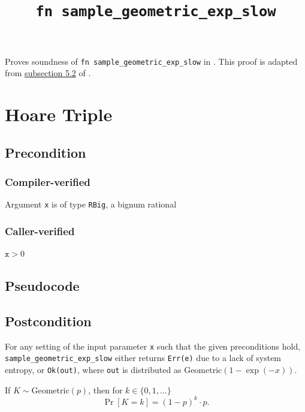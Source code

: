 \documentclass{article}
\title{\texttt{fn sample\_geometric\_exp\_slow}}
\author{\MichaelShoemateAuthor}
\begin{document}
\maketitle

Proves soundness of \texttt{fn sample\_geometric\_exp\_slow} in .
This proof is adapted from \href{https://arxiv.org/pdf/2004.00010.pdf#subsection.5.2}{subsection 5.2} of \cite{CKS20}.

\section{Hoare Triple}
\subsection*{Precondition}
\subsubsection*{Compiler-verified}
Argument \texttt{x} is of type \texttt{RBig}, a bignum rational

\subsubsection*{Caller-verified}
$\texttt{x} > 0$

\subsection*{Pseudocode}


\subsection*{Postcondition}

\begin{theorem}
    \label{postcondition}
    For any setting of the input parameter \texttt{x} such that the given preconditions hold, \\
    \texttt{sample\_geometric\_exp\_slow} either returns \texttt{Err(e)} due to a lack of system entropy,
    or \texttt{Ok(out)}, where \texttt{out} is distributed as $\mathrm{Geometric}(1 - \exp(-x))$.
\end{theorem}

\begin{definition}
    \label{geometric-def}
    If $K \sim \mathrm{Geometric}(p)$, then for $k \in \{0, 1, \ldots\}$
    \begin{equation}
        \Pr[K = k] = (1 - p)^k \cdot p.
    \end{equation}
\end{definition}
\end{document}
